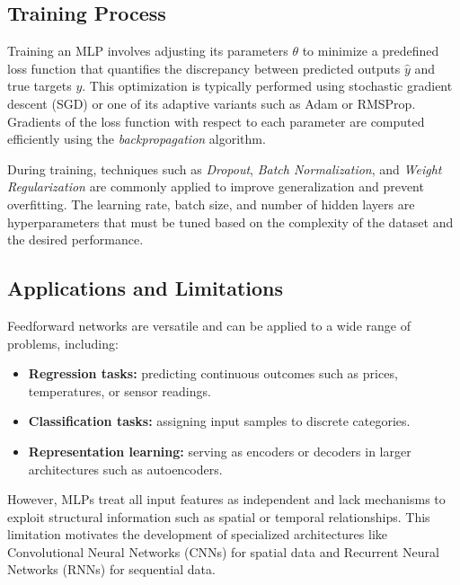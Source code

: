 \documentclass[12pt,a4paper]{report}
\begin{document}
\vspace{1em}
\subsection{Training Process}

Training an MLP involves adjusting its parameters $\theta$ to minimize a predefined loss function that quantifies the discrepancy between predicted outputs $\hat{y}$ and true targets $y$. 
This optimization is typically performed using stochastic gradient descent (SGD) or one of its adaptive variants such as Adam or RMSProp. 
Gradients of the loss function with respect to each parameter are computed efficiently using the \textit{backpropagation} algorithm.

\vspace{0.5em}
During training, techniques such as \textit{Dropout}, \textit{Batch Normalization}, and \textit{Weight Regularization} are commonly applied to improve generalization and prevent overfitting. 
The learning rate, batch size, and number of hidden layers are hyperparameters that must be tuned based on the complexity of the dataset and the desired performance.

\vspace{1em}
\subsection{Applications and Limitations}

Feedforward networks are versatile and can be applied to a wide range of problems, including:
\begin{itemize}
    \item \textbf{Regression tasks:} predicting continuous outcomes such as prices, temperatures, or sensor readings.
    \item \textbf{Classification tasks:} assigning input samples to discrete categories.
    \item \textbf{Representation learning:} serving as encoders or decoders in larger architectures such as autoencoders.
\end{itemize}

However, MLPs treat all input features as independent and lack mechanisms to exploit structural information such as spatial or temporal relationships. 
This limitation motivates the development of specialized architectures like Convolutional Neural Networks (CNNs) for spatial data and Recurrent Neural Networks (RNNs) for sequential data.
\end{document}
